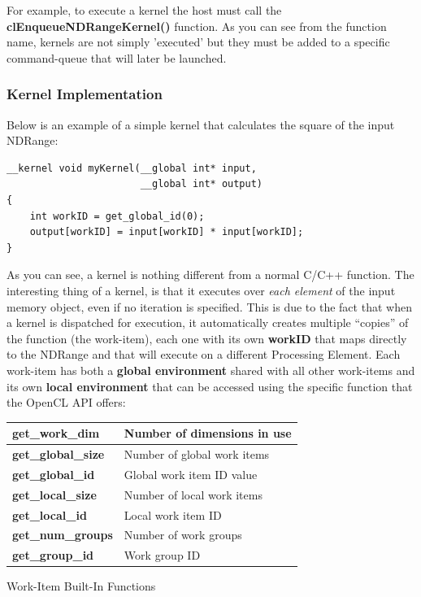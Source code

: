 \begin{CLCode}
For example, to execute a kernel the host must call the \textbf{clEnqueueNDRangeKernel()} function. As you can see from the function name, kernels are not simply 'executed' but they must be added to a specific command-queue that will later be launched.
\end{CLCode}

\subsubsection{Kernel Implementation} \label{sect:kernelImplementation}
Below is an example of a simple kernel that calculates the square of the input NDRange:

{\footnotesize\begin{verbatim}
__kernel void myKernel(__global int* input,
                       __global int* output)
{
    int workID = get_global_id(0);
    output[workID] = input[workID] * input[workID];
}\end{verbatim}}

As you can see, a kernel is nothing different from a normal C/C++ function. The interesting thing of a kernel, is that it executes over \emph{each element} of the input memory object, even if no iteration is specified. This is due to the fact that when a kernel is dispatched for execution, it automatically creates multiple ``copies'' of the function (the work-item), each one with its own \textbf{workID} that maps directly to the NDRange and that will execute on a different Processing Element. Each work-item has both a \textbf{global environment} shared with all other work-items and its own \textbf{local environment} that can be accessed using the specific function that the OpenCL API offers:\\

\begin{tablehere}
{\footnotesize
\begin{tabular}{|p{}|p{}|}\hline
\textbf{get\_work\_dim} & Number of dimensions in use\\ \hline
\textbf{get\_global\_size} & Number of global work items\\ \hline
\textbf{get\_global\_id} & Global work item ID value\\ \hline
\textbf{get\_local\_size} & Number of local work items\\ \hline
\textbf{get\_local\_id} & Local work item ID\\ \hline
\textbf{get\_num\_groups} & Number of work groups\\ \hline
\textbf{get\_group\_id} & Work group ID\\ \hline
\end{tabular}}
  \caption{Work-Item Built-In Functions\\}
	\label{tab:workItemFunctions}
\end{tablehere}


